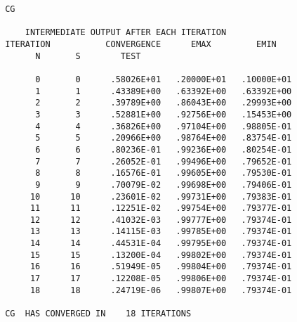 \begin{verbatim}
 CG
 
     INTERMEDIATE OUTPUT AFTER EACH ITERATION
 ITERATION           CONVERGENCE      EMAX         EMIN
       N       S        TEST
 
       0       0      .58026E+01   .20000E+01   .10000E+01
       1       1      .43389E+00   .63392E+00   .63392E+00
       2       2      .39789E+00   .86043E+00   .29993E+00
       3       3      .52881E+00   .92756E+00   .15453E+00
       4       4      .36826E+00   .97104E+00   .98805E-01
       5       5      .20966E+00   .98764E+00   .83754E-01
       6       6      .80236E-01   .99236E+00   .80254E-01
       7       7      .26052E-01   .99496E+00   .79652E-01
       8       8      .16576E-01   .99605E+00   .79530E-01
       9       9      .70079E-02   .99698E+00   .79406E-01
      10      10      .23601E-02   .99731E+00   .79383E-01
      11      11      .12251E-02   .99754E+00   .79377E-01
      12      12      .41032E-03   .99777E+00   .79374E-01
      13      13      .14115E-03   .99785E+00   .79374E-01
      14      14      .44531E-04   .99795E+00   .79374E-01
      15      15      .13200E-04   .99802E+00   .79374E-01
      16      16      .51949E-05   .99804E+00   .79374E-01
      17      17      .12208E-05   .99806E+00   .79374E-01
      18      18      .24719E-06   .99807E+00   .79374E-01
 
 CG  HAS CONVERGED IN    18 ITERATIONS
\end{verbatim}
\newpage
